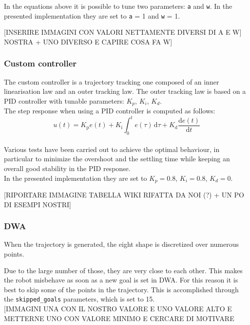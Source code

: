 \documentclass[11pt,a4paper]{article}
\begin{document}
In the equations above it is possible to tune two parameters: \texttt{a} and \texttt{w}.
In the presented implementation they are set to \texttt{a} = 1 and \texttt{w} = 1.

[INSERIRE IMMAGINI CON VALORI NETTAMENTE DIVERSI DI A E W] NOSTRA + UNO DIVERSO E CAPIRE COSA FA W] \\

\subsubsection{Custom controller}

The custom controller is a trajectory tracking one composed of an inner linearisation law and an outer tracking law.
The outer tracking law is based on a PID controller with tunable parameters: $K_p$, $K_i$, $K_d$.\\

The step response when using a PID controller is computed as follows:
$$ {\displaystyle u(t)=K_{\text{p}}e(t)+K_{\text{i}}\int _{0}^{t}e(\tau )\,\mathrm {d} \tau +K_{\text{d}}{\frac {\mathrm {d} e(t)}{\mathrm {d} t}}} $$ \\

Various tests have been carried out to achieve the optimal behaviour, in particular to minimize the overshoot and
the settling time while keeping an overall good stability in the PID response.\\

In the presented implementation they are set to $K_p = 0.8$, $K_i = 0.8$, $K_d = 0$.

[RIPORTARE IMMAGINE TABELLA WIKI RIFATTA DA NOI (?) + UN PO DI ESEMPI NOSTRI]

\subsubsection{DWA}

When the trajectory is generated, the eight shape is discretized over numerous points.

Due to the large number of those, they are very close to each other. This makes the robot misbehave as soon as
a new goal is set in DWA. For this reason it is best to skip some of the points in the trajectory.
This is accomplished through the \texttt{skipped\_goals} parameters, which is set to 15.\\

[IMMAGINI UNA CON IL NOSTRO VALORE E UNO VALORE ALTO E METTERNE UNO CON VALORE MINIMO E CERCARE DI MOTIVARE
\end{document}
